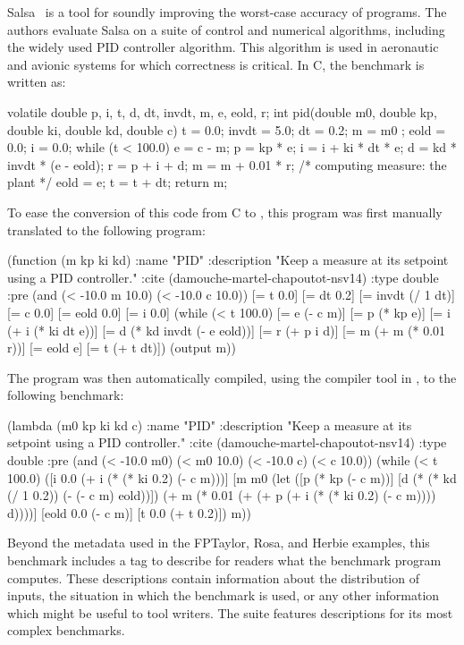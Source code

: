 \documentclass[main.tex]{subfiles}
\begin{document}
Salsa~\cite{fmics15} is a tool for soundly improving the worst-case
accuracy of programs.  The authors evaluate Salsa on a suite of control and
numerical algorithms, including the widely used PID controller algorithm.
This algorithm is used in aeronautic and avionic systems for which
correctness is critical. In C, the benchmark is written as:

\begin{code}
volatile double p, i, t, d, dt, invdt, m, e, eold, r; 
int pid(double m0, double kp, double ki, double kd, double c){
  t     = 0.0;
  invdt = 5.0;
  dt    = 0.2;
  m     = m0 ;
  eold  = 0.0;
  i     = 0.0;
  while (t < 100.0) {
       e = c - m;
       p = kp * e;
       i = i + ki * dt * e;
       d = kd * invdt * (e - eold);
       r = p + i + d;
       m = m + 0.01 * r; /* computing measure: the plant */
       eold = e;
       t = t + dt;
  }
  return m;
}
\end{code}

To ease the conversion of this code from C to \core,
  this program was first manually translated
  to the following \surface program:

\begin{code}
(function (m kp ki kd)
 :name "PID"
 :description "Keep a measure at its setpoint using a PID controller."
 :cite (damouche-martel-chapoutot-nsv14)
 :type double
 :pre (and (< -10.0 m 10.0) (< -10.0 c 10.0))
 [= t 0.0]
 [= dt 0.2]
 [= invdt (/ 1 dt)]
 [= c 0.0]
 [= eold 0.0]
 [= i 0.0]
 (while (< t 100.0)
   [= e (- c m)]
   [= p (* kp e)]
   [= i (+ i (* ki dt e))]
   [= d (* kd invdt (- e eold))]
   [= r (+ p i d)]
   [= m (+ m (* 0.01 r))]
   [= eold e]
   [= t (+ t dt)])
 (output m))
\end{code}

The \surface program was then automatically compiled,
  using the compiler tool in \name,
  to the following \core benchmark:

\begin{code}
(lambda (m0 kp ki kd c)
  :name "PID"
  :description "Keep a measure at its setpoint using a PID controller."
  :cite (damouche-martel-chapoutot-nsv14)
  :type double
  :pre (and (< -10.0 m0) (< m0 10.0) (< -10.0 c) (< c 10.0))
  (while (< t 100.0)
   ([i 0.0 (+ i (* (* ki 0.2) (- c m)))]
    [m m0
     (let ([p (* kp (- c m))]
           [d (* (* kd (/ 1 0.2)) (- (- c m) eold))])
     (+ m (* 0.01 (+ (+ p (+ i (* (* ki 0.2) (- c m)))) d))))]
    [eold 0.0 (- c m)]
    [t 0.0 (+ t 0.2)])
   m))
\end{code}

Beyond the metadata used in the FPTaylor, Rosa, and Herbie examples,
  this benchmark includes a  tag
  to describe for readers what the benchmark program computes.
These descriptions contain information about the distribution of inputs,
  the situation in which the benchmark is used,
  or any other information which might be useful to tool writers.
The \name suite features descriptions for its most complex benchmarks.
\end{document}
